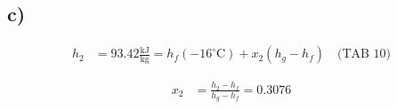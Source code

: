 

\subsection*{c)}

\begin{align*}
h_2 &= 93.42 \frac{\text{kJ}}{\text{kg}} = h_f (-16^\circ \text{C}) + x_2 (h_g - h_f) \quad \text{(TAB 10)}
\end{align*}

\begin{align*}
x_2 &= \frac{h_2 - h_f}{h_g - h_f} = 0.3076
\end{align*}